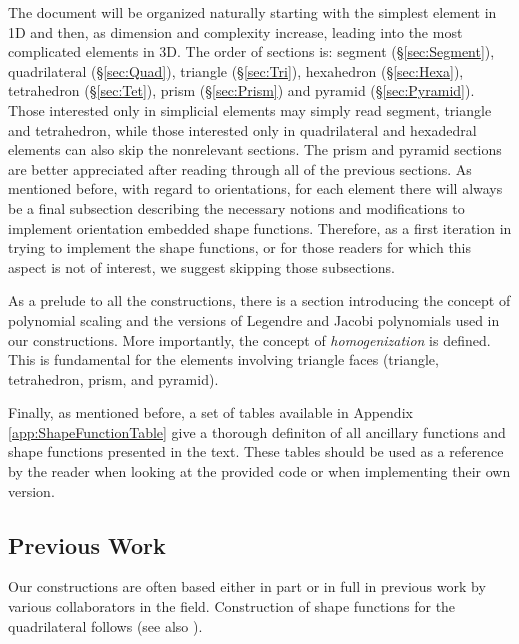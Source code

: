 The document will be organized naturally starting with the simplest element in 1D and then, as dimension and complexity increase, leading into the most complicated elements in 3D.
The order of sections is: segment (\S\ref{sec:Segment}), quadrilateral (\S\ref{sec:Quad}), triangle (\S\ref{sec:Tri}), hexahedron (\S\ref{sec:Hexa}), tetrahedron (\S\ref{sec:Tet}), prism (\S\ref{sec:Prism}) and pyramid (\S\ref{sec:Pyramid}).
Those interested only in simplicial elements may simply read segment, triangle and tetrahedron, while those interested only in quadrilateral and hexadedral elements can also skip the nonrelevant sections.
The prism and pyramid sections are better appreciated after reading through all of the previous sections.
As mentioned before, with regard to orientations, for each element there will always be a final subsection describing the necessary notions and modifications to implement orientation embedded shape functions.
Therefore, as a first iteration in trying to implement the shape functions, or for those readers for which this aspect is not of interest, we suggest skipping those subsections.

As a prelude to all the constructions, there is a section introducing the concept of polynomial scaling and the versions of Legendre and Jacobi polynomials used in our constructions.
More importantly, the concept of \textit{homogenization} is defined.
This is fundamental for the elements involving triangle faces (triangle, tetrahedron, prism, and pyramid).

Finally, as mentioned before, a set of tables available in Appendix \ref{app:ShapeFunctionTable} give a thorough definiton of all ancillary functions and shape functions presented in the text.
These tables should be used as a reference by the reader when looking at the provided code or when implementing their own version.

\subsection{Previous Work}

Our constructions are often based either in part or in full in previous work by various collaborators in the field.
Construction of shape functions for the quadrilateral follows \citet{AinsworthCoyle01} (see also \citet{hpbook2}).

